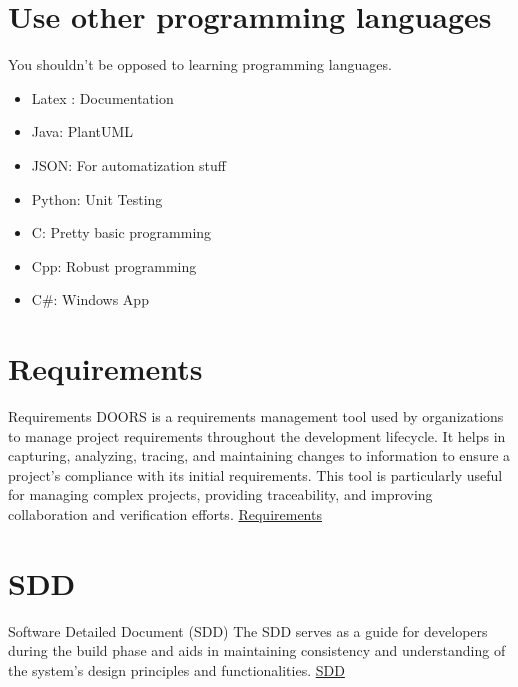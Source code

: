 \documentclass[10pt]{beamer}
\begin{document}
\section{Use other programming languages}
\begin{frame} {You shouldn't be opposed to learning programming languages.}
  \begin{itemize}
    \item Latex : Documentation
    \item Java: PlantUML
    \item JSON: For automatization stuff
    \item Python: Unit Testing
    \item C: Pretty basic programming
    \item Cpp: Robust programming
    \item C\#: Windows App
  \end{itemize}

\end{frame}



\section{Requirements}
\begin{frame} {Requirements}
  DOORS is a requirements management tool used by organizations to manage project requirements throughout the development lifecycle. It helps in capturing, analyzing, tracing, and maintaining changes to information to ensure a project's compliance with its initial requirements. This tool is particularly useful for managing complex projects, providing traceability, and improving collaboration and verification efforts.
  \href{https://doorstop.readthedocs.io/en/latest/}{Requirements}
\end{frame}


\section{SDD}
\begin{frame} {Software Detailed Document (SDD)}
  The SDD serves as a guide for developers during the build phase and aids in maintaining consistency and understanding of the system's design principles and functionalities.
  \href{https://docs.google.com/document/d/1unF8FmWHeOJKlPy6cR2QpmrcaOKSOiiO/edit?usp=sharing&ouid=109808472061203912811&rtpof=true&sd=true}{SDD}
\end{frame}
\end{document}
